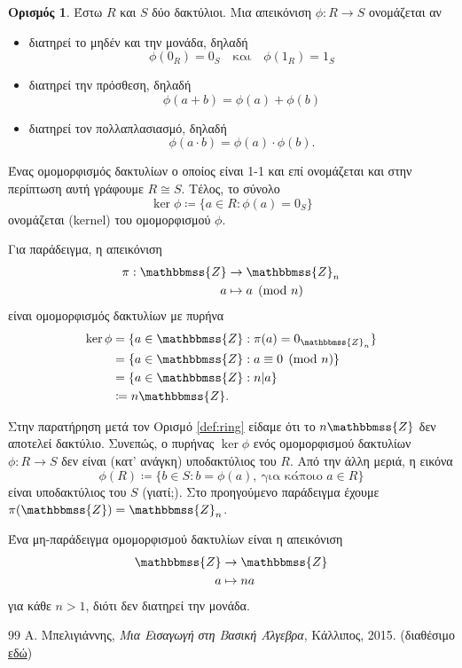 \documentclass[12pt,a4paper,reqno]{amsart}
\theoremstyle{definition}
\newtheorem{definition}[theorem]{Ορισμός}
\theoremstyle{remark}
\numberwithin{theorem}{section}
\numberwithin{exercise}{section}
\numberwithin{equation}{section}
\newcommand{\ZZ}{\mathbbmss{Z}}
\renewcommand{\to}{\rightarrow}
\newcommand{\defn}[1]{{\color{mylightblue}{#1}}}
\begin{document}
\begin{definition}
    \label{def:ring_homomorphism}
    Έστω $R$ και $S$ δύο δακτύλιοι. Μια απεικόνιση $\phi : R \to S$ ονομάζεται \defn{ομομορφισμός δακτυλίων} αν 
    \begin{itemize}
        \item διατηρεί το μηδέν και την μονάδα, δηλαδή 
        \[
        \phi(0_R) = 0_S \quad \text{και} \quad \phi(1_R) = 1_S
        \]
        \item διατηρεί την πρόσθεση, δηλαδή 
        \[
        \phi(a+b) = \phi(a) + \phi(b) 
        \]
        \item διατηρεί τον πολλαπλασιασμό, δηλαδή 
        \[
        \phi(a\cdot b) = \phi(a)\cdot\phi(b).
        \]
    \end{itemize}
    Ένας ομομορφισμός δακτυλίων ο οποίος είναι 1-1 και επί ονομάζεται \defn{ισομορφισμός} και στην περίπτωση αυτή γράφουμε $R \cong S$. Tέλος, το σύνολο 
    \[
    \ker\phi \coloneqq \{a \in R : \phi(a) = 0_S\}
    \]
    ονομάζεται \defn{πυρήνας} (kernel) του ομομορφισμού $\phi$.
\end{definition}

Για παράδειγμα, η απεικόνιση 
\begin{align*}
    \pi : \ZZ &\to \ZZ_n \\ 
    a &\mapsto a \pmod{n}
\end{align*}
είναι ομομορφισμός δακτυλίων με πυρήνα 
\begin{align*}
    \ker\phi 
    &= \{a \in \ZZ : \pi(a) = 0_{\ZZ_n}\} \\
    &= \{a \in \ZZ : a \equiv 0 \pmod{n}\} \\
    &= \{a \in \ZZ : n \vert a\} \\
    &\coloneqq n\ZZ.
\end{align*}

Στην παρατήρηση μετά τον Ορισμό \ref{def:ring} είδαμε ότι το $n\ZZ$ δεν αποτελεί δακτύλιο. Συνεπώς, ο πυρήνας $\ker\phi$ ενός ομομορφισμού δακτυλίων $\phi: R \to S$ δεν είναι (κατ' ανάγκη) υποδακτύλιος του $R$. Από την άλλη μεριά, η εικόνα
\[
\phi(R) \coloneqq \{b \in S : b = \phi(a), \ \text{για κάποιο $a \in R$}\}
\]
είναι υποδακτύλιος του $S$ (γιατί;). Στο προηγούμενο παράδειγμα έχουμε $\pi(\ZZ) = \ZZ_n$.

Ένα μη-παράδειγμα ομομορφισμού δακτυλίων είναι η απεικόνιση 
\begin{align*}
    \ZZ &\to \ZZ \\
    a &\mapsto na
\end{align*}
για κάθε $n > 1$, διότι δεν διατηρεί την μονάδα.

\begin{thebibliography}{99}
    Α. Μπελιγιάννης, 
    \textit{Μια Εισαγωγή στη Βασική Άλγεβρα},
    Κάλλιπος, 2015. (διαθέσιμο \href{https://dx.doi.org/10.57713/kallipos-547}{εδώ})
\end{thebibliography}
\end{document}
